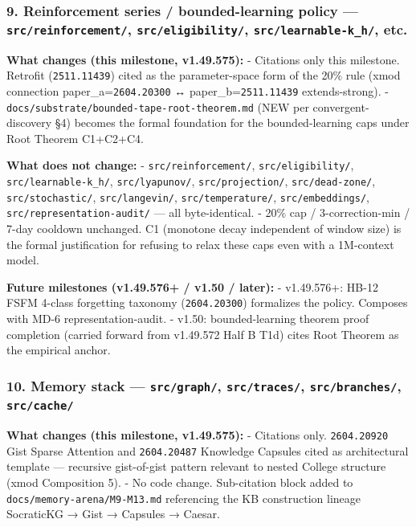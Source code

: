 \documentclass[11pt,letterpaper]{article}
\newcommand{\arxivid}[1]{\texttt{\textcolor{accent}{#1}}}
\begin{document}
\subsubsection{\texorpdfstring{9. Reinforcement series /
bounded-learning policy --- \texttt{src/reinforcement/},
\texttt{src/eligibility/}, \texttt{src/learnable-k\_h/},
etc.}{9. Reinforcement series / bounded-learning policy --- src/reinforcement/, src/eligibility/, src/learnable-k\_h/, etc.}}

\textbf{What changes (this milestone, v1.49.575):} - Citations only this
milestone. Retrofit (\arxivid{2511.11439}) cited as the parameter-space
form of the 20\% rule (xmod connection paper\_a=\arxivid{2604.20300} ↔
paper\_b=\arxivid{2511.11439} extends-strong). -
\texttt{docs/substrate/bounded-tape-root-theorem.md} (NEW per
convergent-discovery §4) becomes the formal foundation for the
bounded-learning caps under Root Theorem C1+C2+C4.

\textbf{What does not change:} - \texttt{src/reinforcement/},
\texttt{src/eligibility/}, \texttt{src/learnable-k\_h/},
\texttt{src/lyapunov/}, \texttt{src/projection/},
\texttt{src/dead-zone/}, \texttt{src/stochastic/},
\texttt{src/langevin/}, \texttt{src/temperature/},
\texttt{src/embeddings/}, \texttt{src/representation-audit/} --- all
byte-identical. - 20\% cap / 3-correction-min / 7-day cooldown
unchanged. C1 (monotone decay independent of window size) is the formal
justification for refusing to relax these caps even with a 1M-context
model.

\textbf{Future milestones (v1.49.576+ / v1.50 / later):} - v1.49.576+:
HB-12 FSFM 4-class forgetting taxonomy (\arxivid{2604.20300}) formalizes
the policy. Composes with MD-6 representation-audit. - v1.50:
bounded-learning theorem proof completion (carried forward from
v1.49.572 Half B T1d) cites Root Theorem as the empirical anchor.

\subsubsection{\texorpdfstring{10. Memory stack --- \texttt{src/graph/},
\texttt{src/traces/}, \texttt{src/branches/},
\texttt{src/cache/}}{10. Memory stack --- src/graph/, src/traces/, src/branches/, src/cache/}}

\textbf{What changes (this milestone, v1.49.575):} - Citations only.
\arxivid{2604.20920} Gist Sparse Attention and \arxivid{2604.20487}
Knowledge Capsules cited as architectural template --- recursive
gist-of-gist pattern relevant to nested College structure (xmod
Composition 5). - No code change. Sub-citation block added to
\texttt{docs/memory-arena/M9-M13.md} referencing the KB construction
lineage SocraticKG → Gist → Capsules → Caesar.
\end{document}
